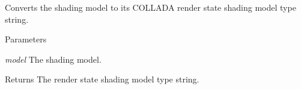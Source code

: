 \label{namespaceFUDaePassStateShadeModel_a726a28704b8c2b6a332d851f8e7887b0}
Converts the shading model to its COLLADA render state shading model type string. 
\begin{DoxyParams}{Parameters}
\item[{\em model}]The shading model. \end{DoxyParams}
\begin{DoxyReturn}{Returns}
The render state shading model type string. 
\end{DoxyReturn}
